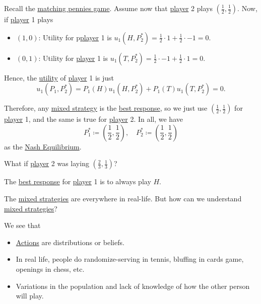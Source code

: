 \begin{prev}
	Recall the \hyperref[eg:matching-pennies]{matching pennies game}. Assume now that \hyperref[def:player]{player} 2 plays \((\frac{1}{2}, \frac{1}{2})\).
	Now, if \hyperref[def:player]{player} 1 plays
	\begin{itemize}
		\item \((1, 0)\): Utility for p\hyperref[def:player]{player} 1 is \(u_1(H, P^{\ast}_2) = \frac{1}{2}\cdot 1 + \frac{1}{2}\cdot -1 = 0\).
		\item \((0, 1)\): Utility for \hyperref[def:player]{player} 1 is \(u_1(T, P^{\ast}_2) = \frac{1}{2}\cdot -1 + \frac{1}{2}\cdot 1 = 0\).
	\end{itemize}
	Hence, the \hyperref[def:reward]{utility} of \hyperref[def:player]{player} 1 is just
	\[
		u_1(P_1, P^{\ast}_2) = P_1(H)u_1(H, P^{\ast}_2)+P_1(T)u_1(T, P^{\ast}_2) = 0.
	\]

	Therefore, any \hyperref[def:mixed-strategy]{mixed strategy} is the \hyperref[def:best-response]{best response}, so we just use
	\((\frac{1}{2}, \frac{1}{2})\) for \hyperref[def:player]{player} 1, and the same is true for \hyperref[def:player]{player} 2. In all, we have
	\[
		P_1^{\ast}\coloneqq \left(\frac{1}{2}, \frac{1}{2}\right), \quad P_2^{\ast}\coloneqq \left(\frac{1}{2}, \frac{1}{2}\right)
	\]
	as the \hyperref[def:Nash-equilibrium]{Nash Equilibrium}.

	\begin{problem}
	What if \hyperref[def:player]{player} 2 was laying \(\left(\frac{2}{3}, \frac{1}{3}\right)\)?
	\end{problem}
	\begin{answer}
		The \hyperref[def:best-response]{best response} for \hyperref[def:player]{player} 1 is to always play \(H\).
	\end{answer}
\end{prev}

\begin{problem}
The \hyperref[def:mixed-strategy]{mixed strategies} are everywhere in real-life. But how can we understand \hyperref[def:mixed-strategy]{mixed strategies}?
\end{problem}
\begin{answer}
	We see that
	\begin{itemize}
		\item \hyperref[def:strategy]{Actions} are distributions or beliefs.
		\item In real life, people do randomize-serving in tennis, bluffing in cards game, openings in chess, etc.
		\item Variations in the population and lack of knowledge of how the other person will play.
	\end{itemize}
\end{answer}


